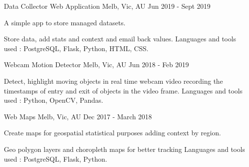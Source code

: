 


\begin{cventries}


\cventry
{} %
{Data Collector Web Application} %
{Melb, Vic, AU} %
{Jun 2019 - Sept 2019} %
{ %
\begin{cvitems}
\item {A simple app to store managed datasets.}
\item {Store data, add stats and context and email back values. Languages and tools used : PostgreSQL, Flask, Python, HTML, CSS.}
\end{cvitems}
}


\cventry
{} %
{Webcam Motion Detector} %
{Melb, Vic, AU} %
{Jun 2018 - Feb 2019} %
{ %
\begin{cvitems}
\item {Detect, highlight moving objects in real time webcam video recording the timestamps of entry and exit of objects in the video frame. Languages and tools used : Python, OpenCV, Pandas.}
\end{cvitems}
}


\cventry
{} %
{Web Maps} %
{Melb, Vic, AU} %
{Dec 2017 - March 2018} %
{ %
\begin{cvitems}
\item {Create maps for geospatial statistical purposes adding context by region.}
\item {Geo polygon layers and choropleth maps for better tracking Languages and tools used : PostgreSQL, Flask, Python.}
\end{cvitems} 
}


\end{cventries}